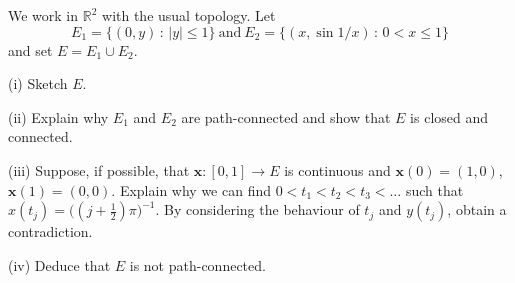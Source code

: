 \begin{theorem}\label{T;connected not path-connected}
We work in ${\mathbb R}^{2}$ with the usual topology. Let
\[E_{1}=\{(0,y)\,:\,|y|\leq 1\}
\ \text{and}
\ E_{2}=\{(x,\sin 1/x)\,:\,0<x\leq 1\}\]
and set $E=E_{1}\cup E_{2}$.

(i) Sketch $E$.

(ii) Explain why $E_{1}$ and $E_{2}$ are path-connected
and show that $E$ is closed and connected.

(iii) Suppose, if possible, that ${\mathbf x}:[0,1]\rightarrow E$
is continuous and ${\mathbf x}(0)=(1,0)$, ${\mathbf x}(1)=(0,0)$.
Explain why we can find $0<t_{1}<t_{2}<t_{3}<\dots$ such that
$x(t_{j})=\big((j+\tfrac{1}{2})\pi)^{-1}$. By considering the behaviour
of $t_{j}$ and $y(t_{j})$, obtain a contradiction.

(iv) Deduce that $E$ is not path-connected.
\end{theorem}

